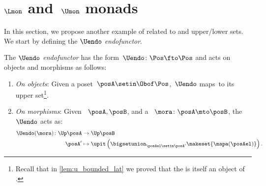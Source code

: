 %
%

\section{$\Lmon$ and~$\Umon$ monads}
In this section, we propose another example of  related to  and upper/lower sets.
We start by defining the \emph{$\Uendo$ endofunctor}.
\begin{definition}
    \label{def:Uendo}
    The \emph{$\Uendo$ endofunctor} has the form~$\Uendo \colon \Pos \fto \Pos$ and acts on objects and morphisms as follows:
    \begin{enumerate}
        \item \emph{On objects}: Given a poset~$\posA \setin \Obof\Pos$,~$\Uendo$ maps~\posA to its upper set\footnote{Recall that in \cref{lem:u_bounded_lat} we proved that the  is itself an object of \Pos.
              }.
        \item \emph{On morphisms}: Given ~$\posA,\posB$, and a ~$\mora \colon \posA\mto \posB$, the~$\Uendo$  acts as:
              \begin{equation}
                  \begin{aligned}
                      \Uendo(\mora)\colon \Up \posA & \to \Up \posB \\
                      \posA'                        & \mapsto \upit \left( \bigsetunion_{\posAel\setin \posA'} \makeset{\mapa(\posAel)}\right).
                  \end{aligned}
              \end{equation}
    \end{enumerate}
\end{definition}

